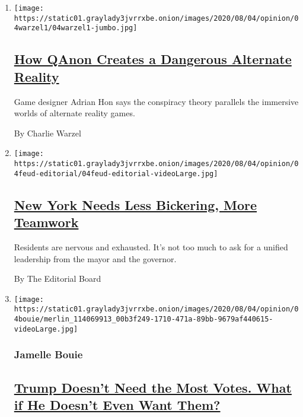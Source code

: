 \begin{enumerate}
\def\labelenumi{\arabic{enumi}.}
\item
  \texttt{[image: https://static01.graylady3jvrrxbe.onion/images/2020/08/04/opinion/04warzel1/04warzel1-jumbo.jpg]}

  \hypertarget{how-qanon-creates-a-dangerous-alternate-reality}{%
  \subsection{\texorpdfstring{\href{/2020/08/04/opinion/qanon-conspiracy-theory-arg.html}{How
  QAnon Creates a Dangerous Alternate
  Reality}}{How QAnon Creates a Dangerous Alternate Reality}}\label{how-qanon-creates-a-dangerous-alternate-reality}}

  Game designer Adrian Hon says the conspiracy theory parallels the
  immersive worlds of alternate reality games.

  By Charlie Warzel
\item
  \texttt{[image: https://static01.graylady3jvrrxbe.onion/images/2020/08/04/opinion/04feud-editorial/04feud-editorial-videoLarge.jpg]}

  \hypertarget{new-york-needs-less-bickering-more-teamwork}{%
  \subsection{\texorpdfstring{\href{/2020/08/04/opinion/cuomo-de-blasio-coronavirus-nyc.html}{New
  York Needs Less Bickering, More
  Teamwork}}{New York Needs Less Bickering, More Teamwork}}\label{new-york-needs-less-bickering-more-teamwork}}

  Residents are nervous and exhausted. It's not too much to ask for a
  unified leadership from the mayor and the governor.

  By The Editorial Board
\item
  \texttt{[image: https://static01.graylady3jvrrxbe.onion/images/2020/08/04/opinion/04bouie/merlin\_114069913\_00b3f249-1710-471a-89bb-9679af440615-videoLarge.jpg]}

  \hypertarget{jamelle-bouie}{%
  \subsubsection{Jamelle Bouie}\label{jamelle-bouie}}

  \hypertarget{trump-doesnt-need-the-most-votes-what-if-he-doesnt-even-want-them}{%
  \subsection{\texorpdfstring{\href{/2020/08/04/opinion/trump-2020-electoral-college.html}{Trump
  Doesn't Need the Most Votes. What if He Doesn't Even Want
  Them?}}{Trump Doesn't Need the Most Votes. What if He Doesn't Even Want Them?}}\label{trump-doesnt-need-the-most-votes-what-if-he-doesnt-even-want-them}}


\end{enumerate}
